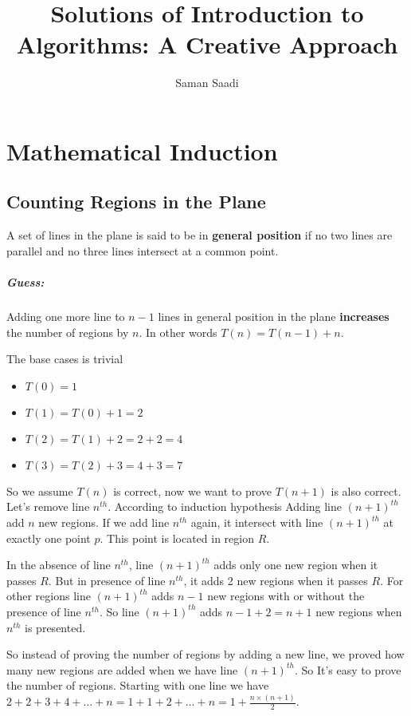 \documentclass{book}
\title{Solutions of Introduction to Algorithms: A Creative Approach}
\author{Saman Saadi}
\date{}
\begin{document}
	\frontmatter
	\maketitle
	\tableofcontents
	\mainmatter
	\chapter{Mathematical Induction}
	\section{Counting Regions in the Plane}
	A set of lines in the plane is said to be in \textbf{general position} if no two lines are parallel and no three lines intersect at a common point.
	\paragraph{Guess:} Adding one more line to $n - 1$ lines in general position in the plane \textbf{increases} the number of regions by $n$. In other words $T(n) = T(n - 1) + n$.
	\par The base cases is trivial
	\begin{itemize}
		\item $T(0) = 1$
		\item $T(1) = T(0) + 1 = 2$
		\item $T(2) = T(1) + 2 = 2 + 2 = 4$
		\item $T(3) = T(2) + 3 = 4 + 3 = 7$
	\end{itemize}
	So we assume $T(n)$ is correct, now we want to prove $T(n + 1)$ is also correct. Let's remove line $n^{th}$. According to induction hypothesis Adding line $(n+1)^{th}$ add $n$ new regions. If we add line $n^{th}$ again, it intersect with line $(n+1)^{th}$ at exactly one point $p$. This point is located in region $R$.
	\par In the absence of line $n^{th}$, line $(n+1)^{th}$ adds only one new region when it passes $R$. But in presence of line $n^{th}$, it adds 2 new regions when it passes $R$. For other regions line $(n+1)^{th}$ adds $n - 1$ new regions with or without the presence of line $n^{th}$. So line $(n+1)^{th}$ adds $n - 1 + 2 = n + 1$ new regions when $n^{th}$ is presented.
	\par So instead of proving the number of regions by adding a new line, we proved how many new regions are added when we have line $(n + 1)^{th}$. So It's easy to prove the number of regions. Starting with one line we have $2 + 2 + 3 + 4 + \dots + n = 1 + 1 + 2 + \dots + n = 1 + \frac{n \times (n + 1)}{2}$.
	
\end{document}
